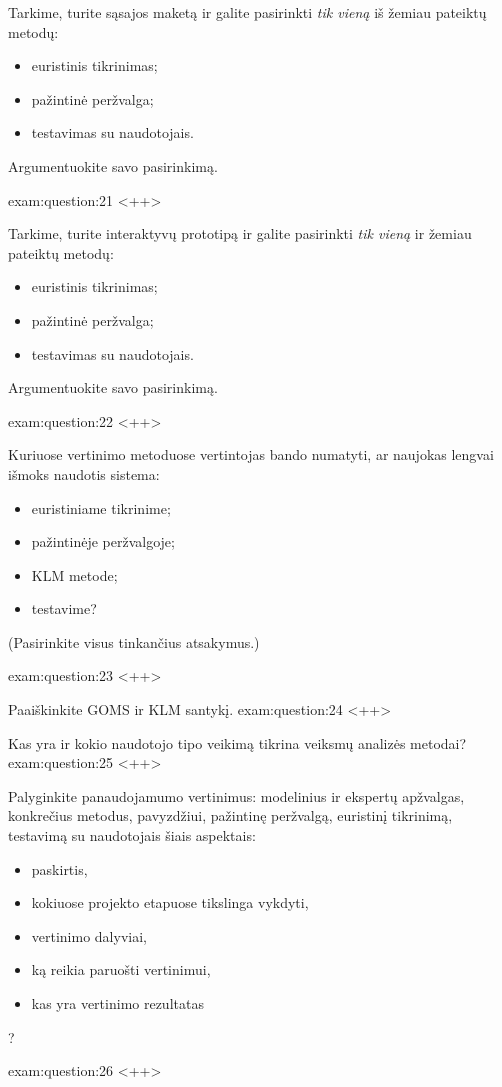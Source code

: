 \begin{question}{%
  Tarkime, turite sąsajos maketą ir galite pasirinkti \emph{tik vieną}
  iš žemiau pateiktų metodų:
  \begin{itemize}
    \item euristinis tikrinimas;
    \item pažintinė peržvalga;
    \item testavimas su naudotojais.
  \end{itemize}
  Argumentuokite savo pasirinkimą.
  }{exam:question:21}
  <++>
\end{question}

\begin{question}{%
  Tarkime, turite interaktyvų prototipą ir galite pasirinkti \emph{tik
  vieną} ir žemiau pateiktų metodų:
  \begin{itemize}
    \item euristinis tikrinimas;
    \item pažintinė peržvalga;
    \item testavimas su naudotojais.
  \end{itemize}
  Argumentuokite savo pasirinkimą.
  }{exam:question:22}
  <++>
\end{question}

\begin{question}{%
  Kuriuose vertinimo metoduose vertintojas bando numatyti, ar naujokas
  lengvai išmoks naudotis sistema:
  \begin{itemize}
    \item euristiniame tikrinime;
    \item pažintinėje peržvalgoje;
    \item KLM metode;
    \item testavime?
  \end{itemize}
  (Pasirinkite visus tinkančius atsakymus.)
  }{exam:question:23}
  <++>
\end{question}

\begin{question}{%
  Paaiškinkite GOMS ir KLM santykį.
  }{exam:question:24}
  <++>
\end{question}

\begin{question}{%
  Kas yra ir kokio naudotojo tipo veikimą tikrina veiksmų analizės metodai?
  }{exam:question:25}
  <++>
\end{question}

\begin{question}{%
  Palyginkite panaudojamumo vertinimus: modelinius ir ekspertų apžvalgas,
  konkrečius metodus, pavyzdžiui, pažintinę peržvalgą, euristinį
  tikrinimą, testavimą su naudotojais šiais aspektais:
  \begin{itemize}
    \item paskirtis,
    \item kokiuose projekto etapuose tikslinga vykdyti,
    \item vertinimo dalyviai,
    \item ką reikia paruošti vertinimui,
    \item kas yra vertinimo rezultatas
  \end{itemize}
  ?
  }{exam:question:26}
  <++>
\end{question}

